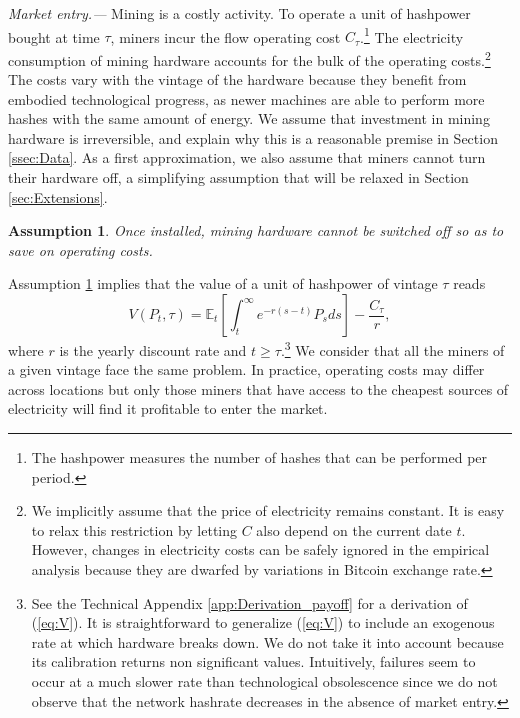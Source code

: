 \documentclass[12pt, a4paper]{article}
\newtheorem{hyp}{Assumption}
\begin{document}
\emph{Market entry.---} Mining is a costly activity.
To operate a unit of hashpower bought at time $\tau$, miners incur the flow operating cost $%
C_{\tau}$.\footnote{The hashpower measures the number of hashes that can be performed per period.} The electricity consumption of mining hardware accounts for the bulk of the operating costs.\footnote{%
We implicitly assume that the price of electricity remains
constant. It is easy to relax this restriction by letting $C$ also depend on
the current date $t$. However, changes in electricity costs can be safely
ignored in the empirical analysis because they are dwarfed by variations in
Bitcoin exchange rate.} The costs vary with the vintage of the hardware because they
benefit from embodied technological progress, as newer machines are able to
perform more hashes with the same amount of energy. We assume that investment in mining hardware is irreversible,
and explain why this is a reasonable premise
in Section \ref{ssec:Data}. As a first approximation, we also assume
that miners cannot turn their hardware off, a
simplifying assumption that will be relaxed in Section \ref{sec:Extensions}.

\begin{hyp}
\label{hyp:keep-going} Once installed, mining hardware cannot be switched off so as
to save on operating costs.
\end{hyp}

Assumption \ref{hyp:keep-going} implies that the value of a unit of
hashpower of vintage $\tau $ reads
\begin{equation}
V(P_{t},\tau )=\mathbb{E}_{t}\left[ \int_{t}^{\infty }e^{-r(s-t)}P_{s}ds\right] -%
\frac{C_{\tau }}{r},  \label{eq:V}
\end{equation}%
where $r$ is the yearly discount rate and $t \geq \tau$.\footnote{%
See the Technical Appendix \ref{app:Derivation_payoff} for a derivation of (\ref{eq:V}).
It is straightforward to generalize (\ref{eq:V}) to include an exogenous rate at which hardware breaks down.
We do not take it into account because its calibration returns non significant values.
Intuitively, failures seem to occur at a much slower rate than technological obsolescence
since we do not observe that the network hashrate decreases in the absence
of market entry.} We consider that all the miners of a given vintage
face the same problem. In practice, operating costs may differ across
locations but only those miners that have access to the
cheapest sources of electricity will find it profitable to enter the market.
\end{document}

